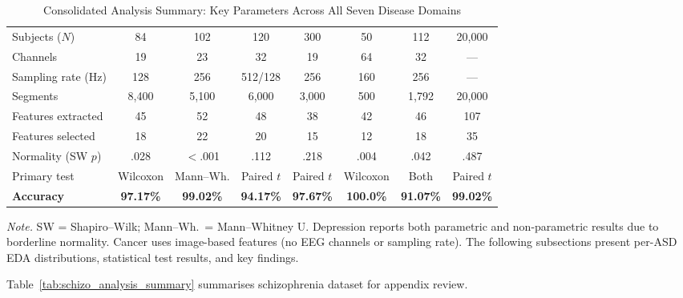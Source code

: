 \begin{xltabular}
{\textwidth}{@{} L c c c c c c c @{}}
\caption[Deep analysis summary across domains]{Consolidated Analysis Summary: Key Parameters Across All Seven Disease Domains}
\label{tab:deep_analysis_consolidated}\\
\toprule
{} &  &  &  &  &  &  &  \\
\midrule
\endfirsthead
\endhead
\bottomrule
\endlastfoot
Subjects ($N$) & 84 & 102 & 120 & 300 & 50 & 112 & 20,000 \\
\addlinespace
Channels & 19 & 23 & 32 & 19 & 64 & 32 & --- \\
\addlinespace
Sampling rate (Hz) & 128 & 256 & 512/128 & 256 & 160 & 256 & --- \\
\addlinespace
Segments & 8,400 & 5,100 & 6,000 & 3,000 & 500 & 1,792 & 20,000 \\
\addlinespace
Features extracted & 45 & 52 & 48 & 38 & 42 & 46 & 107 \\
\addlinespace
Features selected & 18 & 22 & 20 & 15 & 12 & 18 & 35 \\
\addlinespace
Normality (SW $p$) & .028 & $<$.001 & .112 & .218 & .004 & .042 & .487 \\
\addlinespace
Primary test & Wilcoxon & Mann--Wh. & Paired $t$ & Paired $t$ & Wilcoxon & Both & Paired $t$ \\
\addlinespace
\textbf{Accuracy} & \textbf{97.17\%} & \textbf{99.02\%} & \textbf{94.17\%} & \textbf{97.67\%} & \textbf{100.0\%} & \textbf{91.07\%} & \textbf{99.02\%} \\
\end{xltabular}
\endgroup

\vspace{0.5em}\noindent\textit{Note.} SW = Shapiro--Wilk; Mann--Wh.\ = Mann--Whitney U. Depression reports both parametric and non-parametric results due to borderline normality. Cancer uses image-based features (no EEG channels or sampling rate). The following subsections present per-ASD EDA distributions, statistical test results, and key findings.

\iffalse %
\label{tab:schizo_analysis_summary}
\noindent Table~\ref{tab:schizo_analysis_summary} summarises schizophrenia dataset for appendix review.

